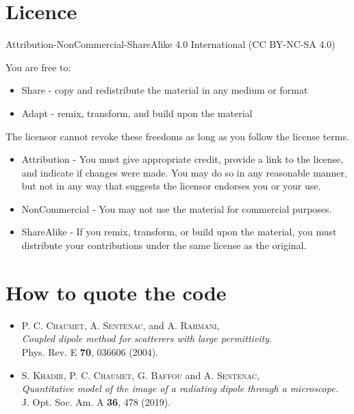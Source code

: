 \section{Licence}


Attribution-NonCommercial-ShareAlike 4.0 International (CC BY-NC-SA 4.0)

You are free to:

\begin{itemize}
\item Share - copy and redistribute the material in any medium or
  format
\item Adapt - remix, transform, and build upon the material
\end{itemize}

The licensor cannot revoke these freedoms as long as you follow the
license terms.
\begin{itemize}
\item Attribution - You must give appropriate credit, provide a link
  to the license, and indicate if changes were made. You may do so in
  any reasonable manner, but not in any way that suggests the licensor
  endorses you or your use.
\item NonCommercial - You may not use the material for commercial
  purposes.
\item ShareAlike - If you remix, transform, or build upon the
  material, you must distribute your contributions under the same
  license as the original.
\end{itemize}



\section{How to quote the code}

\begin{itemize}

\item P. C. {\textsc{Chaumet}}, A. {\textsc{Sentenac}}, and
  A. {\textsc{Rahmani}}, \\{\it Coupled dipole method for scatterers
    with large permittivity.}\\ Phys. Rev. E {\bf 70}, 036606 (2004).

\item S. {\textsc{Khadir}}, P. C. {\textsc{Chaumet}},
  G. {\textsc{Baffou}} and A. {\textsc{Sentenac}}, \\{\it Quantitative
    model of the image of a radiating dipole through a
    microscope.}\\ J. Opt. Soc. Am. A {\bf 36}, 478 (2019).

\end{itemize}
